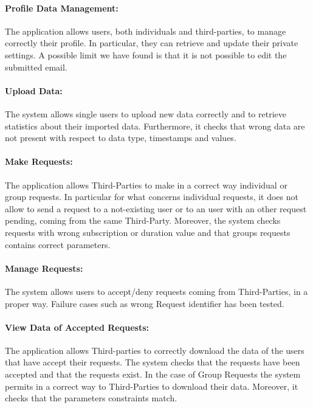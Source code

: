 \documentclass[a4paper]{article}
\begin{document}
\paragraph{Profile Data Management:}
The application allows users, both individuals and third-parties, to manage correctly their profile. In particular, they can retrieve and update their private settings. A possible limit we have found is that it is not possible to edit the submitted email.

\paragraph{Upload Data:}
The system allows single users to upload new data correctly and to retrieve statistics about their imported data. Furthermore, it checks that wrong data  are not present with respect to data type, timestamps and values.

\paragraph{Make Requests:}
The application allows Third-Parties to make in a correct way individual or group requests. In particular for what concerns individual requests, it does not allow  to send a request to a not-existing user or to an user with an other request pending, coming from the same Third-Party. Moreover, the system checks requests with wrong subscription or duration value and that groups requests contains correct parameters.

\paragraph{Manage Requests:}
The system allows users to accept/deny requests coming from Third-Parties, in a proper way. Failure cases such as wrong Request identifier has been tested.

\paragraph{View Data of Accepted Requests:}
The application allows Third-parties to correctly download the data of the users that have accept their requests. The system checks that the requests have been accepted and that the requests exist. In the case of Group Requests the system permits in a correct way to Third-Parties to download their data. Moreover, it checks that the parameters constraints match. 
\end{document}
